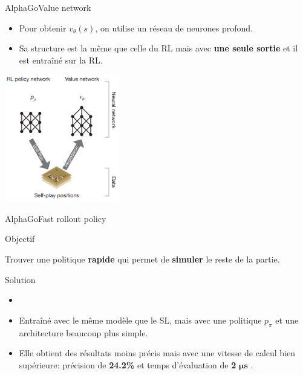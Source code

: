 \begin{frame}{AlphaGo}{Value network}
    \begin{itemize}
        \item Pour obtenir $v_\theta(s)$, on utilise un réseau de neurones profond.
        \item Sa structure est la même que celle du RL mais avec \textbf{une seule sortie} et il est entraîné sur la RL.
    \end{itemize}
    \begin{center}
        \includegraphics[width=5cm]{ressources/AlphaGo/RL_and_VN}
    \end{center}
\end{frame}

\begin{frame}{AlphaGo}{Fast rollout policy}
    \begin{block}{Objectif}
        \begin{center}
            Trouver une politique \textbf{rapide} qui permet de \textbf{simuler} le reste de la partie.
        \end{center}
    \end{block}
    \begin{block}{Solution}
        \begin{itemize}
            \item
            \item Entraîné avec le même modèle que le SL, mais avec une politique $p_\pi$ et une architecture beaucoup plus simple.
            \item Elle obtient des résultats moins précis mais avec une vitesse de calcul bien supérieure: précision de \textbf{24.2\%} et temps d'évaluation de \textbf{2} $\boldsymbol{\mu s}$ .
        \end{itemize}
    \end{block}
\end{frame}


